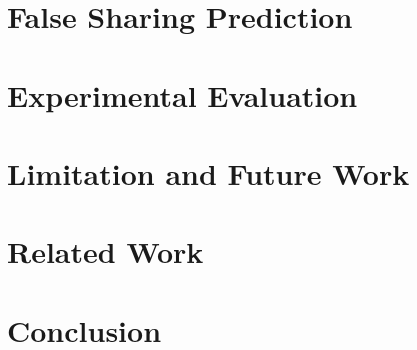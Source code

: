 \documentclass[9pt]{sigplanconf}
\begin{document}
\section{False Sharing Prediction}

%

\section{Experimental Evaluation}


\section{Limitation and Future Work}


%
\section{Related Work}


\section{Conclusion}


%








%

{


}

\end{document}
